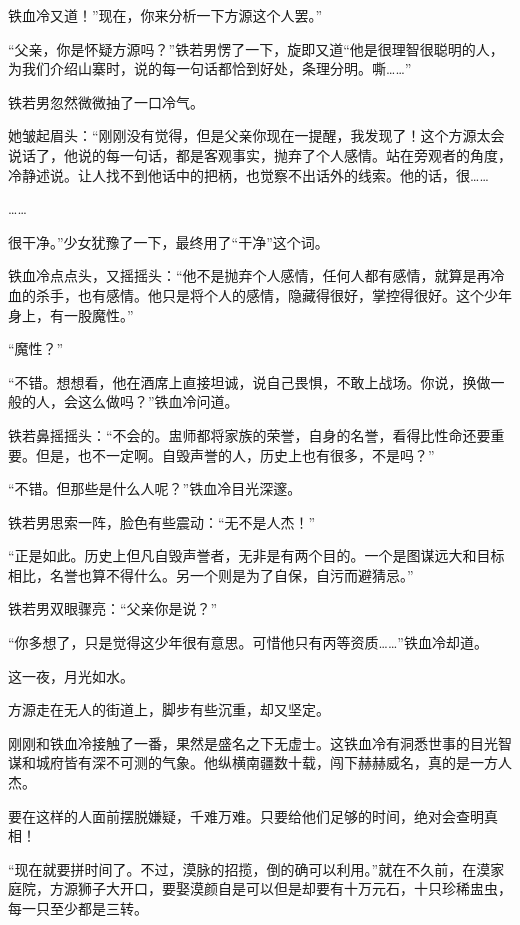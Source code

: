 
\begin{this_body}

铁血冷又道！”现在，你来分析一下方源这个人罢。”

“父亲，你是怀疑方源吗？”铁若男愣了一下，旋即又道“他是很理智很聪明的人，为我们介绍山寨时，说的每一句话都恰到好处，条理分明。嘶……”

铁若男忽然微微抽了一口冷气。

她皱起眉头：“刚刚没有觉得，但是父亲你现在一提醒，我发现了！这个方源太会说话了，他说的每一句话，都是客观事实，抛弃了个人感情。站在旁观者的角度，冷静述说。让人找不到他话中的把柄，也觉察不出话外的线索。他的话，很……

……

很干净。”少女犹豫了一下，最终用了“干净”这个词。

铁血冷点点头，又摇摇头：“他不是抛弃个人感情，任何人都有感情，就算是再冷血的杀手，也有感情。他只是将个人的感情，隐藏得很好，掌控得很好。这个少年身上，有一股魔性。”

“魔性？”

“不错。想想看，他在酒席上直接坦诚，说自己畏惧，不敢上战场。你说，换做一般的人，会这么做吗？”铁血冷问道。

铁若鼻摇摇头：“不会的。盅师都将家族的荣誉，自身的名誉，看得比性命还要重要。但是，也不一定啊。自毁声誉的人，历史上也有很多，不是吗？”

“不错。但那些是什么人呢？”铁血冷目光深邃。

铁若男思索一阵，脸色有些震动：“无不是人杰！”

“正是如此。历史上但凡自毁声誉者，无非是有两个目的。一个是图谋远大和目标相比，名誉也算不得什么。另一个则是为了自保，自污而避猜忌。”

铁若男双眼骤亮：“父亲你是说？”

“你多想了，只是觉得这少年很有意思。可惜他只有丙等资质……”铁血冷却道。

这一夜，月光如水。

方源走在无人的街道上，脚步有些沉重，却又坚定。

刚刚和铁血冷接触了一番，果然是盛名之下无虚士。这铁血冷有洞悉世事的目光智谋和城府皆有深不可测的气象。他纵横南疆数十载，闯下赫赫威名，真的是一方人杰。

要在这样的人面前摆脱嫌疑，千难万难。只要给他们足够的时间，绝对会查明真相！

“现在就要拼时间了。不过，漠脉的招揽，倒的确可以利用。”就在不久前，在漠家庭院，方源狮子大开口，要娶漠颜自是可以但是却要有十万元石，十只珍稀盅虫，每一只至少都是三转。


\end{this_body}
